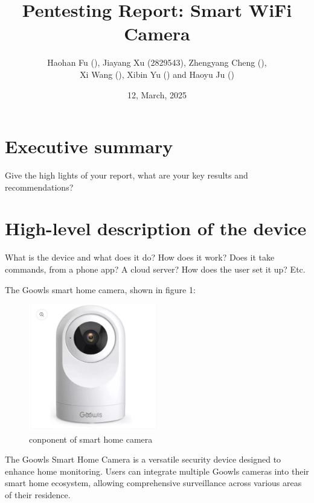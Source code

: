 \documentclass[11pt]{article}
\begin{document}
\title{Pentesting Report: Smart WiFi Camera}
\author{Haohan Fu (), Jiayang Xu (2829543), Zhengyang Cheng (),
\\ Xi Wang (), Xibin Yu () and Haoyu Ju ()}
\date{12, March, 2025}
\maketitle







\section{Executive summary}

Give the high lights of your report, what are your key results and recommendations?

\section{High-level description of the device}

What is the device and what does it do? How does it work? Does it take commands, from a phone app? A cloud server? How does the user set it up? Etc.

The Goowls smart home camera, shown in figure 1:
\begin{figure}[htbp]
    \centering
    \includegraphics[width=0.5\textwidth]{imgs/camera.png}
    \caption{conponent of smart home camera}
\end{figure}

The Goowls Smart Home Camera is a versatile security device designed to enhance home monitoring. Users can integrate multiple Goowls cameras into their smart home ecosystem, allowing comprehensive surveillance across various areas of their residence.
\end{document}
